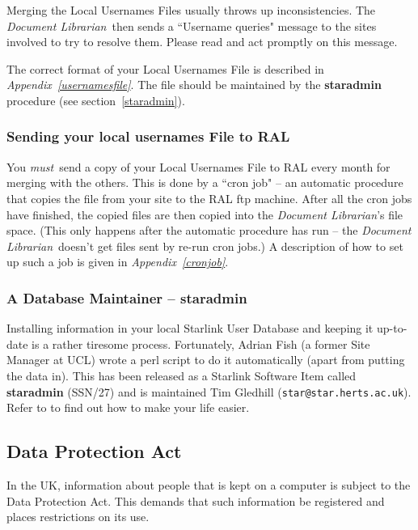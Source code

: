Merging the Local Usernames Files usually throws up inconsistencies.
The {\em Document Librarian}\, then sends a ``Username queries" message to the
sites involved to try to resolve them.
Please read and act promptly on this message.

The correct format of your Local Usernames File is described in
{\em Appendix~\ref{usernamesfile}}.
The file should be maintained by the {\bf staradmin} procedure
(see section~\ref{staradmin}).

\subsubsection{\label{SYLUF}Sending your local usernames File to RAL}

You {\em must}\, send a copy of your Local Usernames File to RAL every
month for merging with the others.
This is done by a ``cron job" -- an automatic procedure that copies the file
from your site to the RAL ftp machine.
After all the cron jobs have finished, the copied files are then copied into
the {\em Document Librarian}'s file space.
(This only happens after the automatic procedure has run -- the {\em Document
Librarian}\, doesn't get files sent by re-run cron jobs.)
A description of how to set up such a job is given in
{\em Appendix~\ref{cronjob}}.

\subsubsection{\label{staradmin}A Database Maintainer --  staradmin}

Installing information in your local Starlink User Database and keeping it
up-to-date is a rather tiresome process.
Fortunately, Adrian Fish (a former Site Manager at UCL) wrote a
perl script to do it automatically (apart from putting the data in).
This has been released as a Starlink Software Item called {\bf staradmin}
(SSN/27) and is maintained Tim Gledhill ({\tt star@star.herts.ac.uk}).
Refer to 
 to find out how to make your life easier.

\subsection{\label{DPA}Data Protection Act}

In the UK, information about people that is kept on a computer is subject to the
Data Protection Act.
This demands that such information be registered and places restrictions on its
use.

